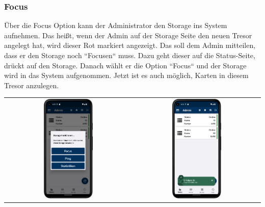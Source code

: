 \newpage

\subsubsection{Focus} \label{subsubsec:focus}
Über die Focus Option kann der Administrator den Storage ins System  aufnehmen. Das heißt, wenn der Admin auf der Storage Seite den neuen Tresor angelegt hat, wird dieser Rot markiert angezeigt. Das soll dem Admin mitteilen, dass er den Storage noch ``Focusen`` muss. Dazu geht dieser auf die Status-Seite, drückt auf den Storage. Danach wählt er die Option ``Focus`` und der Storage wird in das System aufgenommen. Jetzt ist es auch möglich, Karten in diesem Tresor anzulegen.

\vspace{1cm}
\begin{table}[htbp]
  \centering
  \begin{tabular}{cc}
    \includegraphics[width=0.4\textwidth]{FLUTTER/images/ZB/status_page_selector.png} &
    \includegraphics[width=0.4\textwidth]{FLUTTER/images/ZB/status_focus_storage.png} \\

\end{tabular}
\end{table}
